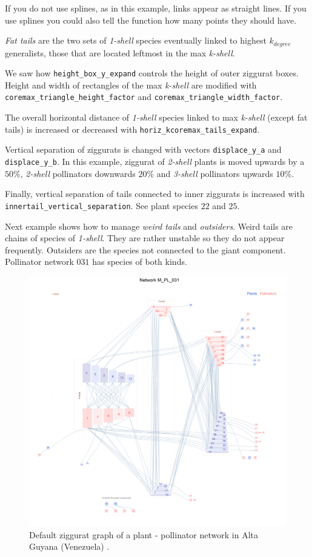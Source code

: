 \documentclass[12pt]{article}
\begin{document}
If you do not use splines, as in this example, links appear as straight lines. If you use splines you could also tell the function how many points they should have.

\textit{Fat tails} are the two sets of \textit{1-shell} species eventually linked to highest $k_{degree}$ generalists, those that are located
leftmost in the max \textit{k-shell}. 

We saw how \texttt{height\_box\_y\_expand} controls the height of outer ziggurat boxes. Height and width of rectangles of the max \textit{k-shell} are modified with \texttt{coremax\_triangle\_height\_factor} and \texttt{coremax\_triangle\_width\_factor}. 

The overall horizontal distance of \textit{1-shell} species linked to max \textit{k-shell} (except fat tails) is increased or decreased with
\texttt{horiz\_kcoremax\_tails\_expand}.

Vertical separation of ziggurats is changed with vectors \texttt{displace\_y\_a} and \texttt{displace\_y\_b}. In this example, ziggurat
of \textit{2-shell} plants is moved upwards by a $50\%$,  \textit{2-shell} pollinators downwards $20\%$ and  \textit{3-shell} pollinators upwards $10\%$.

Finally, vertical separation of tails connected to inner ziggurats is increased with \texttt{innertail\_vertical\_separation}. See plant
species $22$ and $25$.

Next example shows how to manage \textit{weird tails} and \textit{outsiders}. Weird tails are chains of species of \textit{1-shell}. They
are rather unstable so they do not appear frequently. Outsiders are the species not connected to the giant component. Pollinator network $031$
has species of both kinds.

\clearpage
\begin{figure}[hp!]
\centering
\includegraphics[scale=0.45]{M_PL_031_ziggurat.png}
\caption {Default ziggurat graph of a plant - pollinator network in Alta Guyana (Venezuela) \cite{ramirez1989biologia}.}
\label{fig:KMAN_ziggurat_031}
\end{figure}
\end{document}
